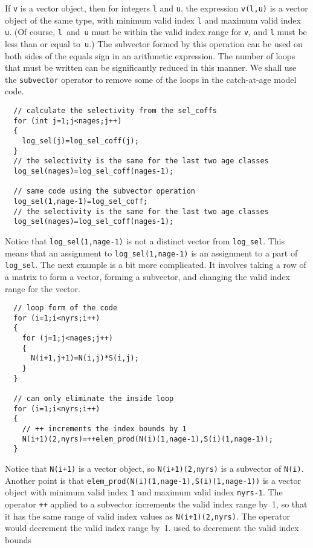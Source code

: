 \documentclass{admbmanual}
\begin{document}
If \texttt{v} is a vector object, then for integers \texttt{l} and \texttt{u},
the expression \texttt{v(l,u)} is a vector object of the same type, with minimum
valid index \texttt{l} and maximum valid index \texttt{u}. (Of course,
\texttt{l}~and~\texttt{u} must be within the valid index range for \texttt{v},
and \texttt{l} must be less than or equal to~\texttt{u}.) The subvector formed
by this operation can be used on both sides of the equals sign in an arithmetic
expression. The number of loops that must be written can be significantly
reduced in this manner. We shall use the \texttt{subvector} operator to remove
some of the loops in the catch-at-age model code.
\begin{lstlisting}
  // calculate the selectivity from the sel_coffs
  for (int j=1;j<nages;j++)
  {
    log_sel(j)=log_sel_coff(j);
  }
  // the selectivity is the same for the last two age classes
  log_sel(nages)=log_sel_coff(nages-1);

  // same code using the subvector operation
  log_sel(1,nage-1)=log_sel_coff;
  // the selectivity is the same for the last two age classes
  log_sel(nages)=log_sel_coff(nages-1);
\end{lstlisting}
Notice that \texttt{log\_sel(1,nage-1)} is not a distinct vector from
\texttt{log\_sel}. This means that an assignment to \texttt{log\_sel(1,nage-1)}
is an assignment to a part of \texttt{log\_sel}. The next example is a bit more
complicated. It involves taking a row of a matrix to form a vector, forming a
subvector, and changing the valid index range for the vector.
\begin{lstlisting}
  // loop form of the code
  for (i=1;i<nyrs;i++)
  {
    for (j=1;j<nages;j++)
    {
      N(i+1,j+1)=N(i,j)*S(i,j);
    }
  }

  // can only eliminate the inside loop
  for (i=1;i<nyrs;i++)
  {
    // ++ increments the index bounds by 1
    N(i+1)(2,nyrs)=++elem_prod(N(i)(1,nage-1),S(i)(1,nage-1));
  }
\end{lstlisting}
Notice that \texttt{N(i+1)} is a vector object, so \texttt{N(i+1)(2,nyrs)} is a
subvector of \texttt{N(i)}. Another point is that
\texttt{elem\_prod(N(i)(1,nage-1),S(i)(1,nage-1))} is a vector object with
minimum valid index \texttt{1} and maximum valid index \texttt{nyrs-1}. The
operator \texttt{++} applied to a subvector increments the valid index range
by~1, so that it has the same range of valid index values as
\texttt{N(i+1)(2,nyrs)}. The operator  would decrement
the valid index range by~1.
%
{used to decrement the valid index bounds}
\end{document}

